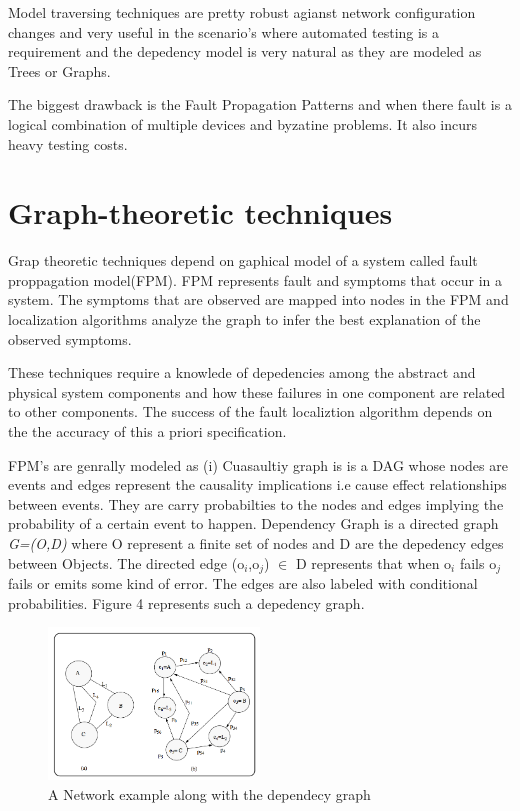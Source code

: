 \documentclass[10pt]{sigplan-proc-varsize}
\begin{document}
Model traversing techniques are pretty robust agianst network configuration changes and very useful in the scenario's where automated testing is a requirement and the depedency model is very natural as they are modeled as Trees or Graphs. 

The biggest drawback is the Fault Propagation Patterns and when there  fault is a logical combination of multiple devices and byzatine problems. It also incurs heavy testing costs. 

\section{Graph-theoretic techniques}
 
Grap theoretic techniques depend on gaphical model of a system called fault proppagation model(FPM). FPM represents fault and symptoms that occur in a system. 
The symptoms that are observed are mapped into nodes in the FPM and localization algorithms analyze the graph to infer the best explanation of the observed symptoms. 

These techniques require a knowlede of depedencies among the abstract and physical system components and how these failures in one component are related to 
other components. The success of the fault localiztion algorithm depends on the the accuracy of this a priori specification.

FPM's are genrally modeled as (i) Cuasaultiy graph is is a DAG whose nodes are events and edges represent the causality implications i.e cause effect relationships 
between events. They are carry probabilties to the nodes and edges implying the probability of a certain event to happen. 
Dependency Graph is a directed graph {\it{G=(O,D)}} where O represent a finite set of nodes and D are the depedency edges between Objects. 
The directed edge (o$_{i}$,o$_{j}$) $\in$ D represents that when o$_{i}$ fails o$_{j}$ fails or emits some kind of error. 
The edges are also labeled with conditional probabilities. Figure 4 represents such a depedency graph.

\begin{figure}[h!]
  \caption{A Network example along with the dependecy graph \cite{Katzela:95}}
  \centering
    \includegraphics[width=0.5\textwidth]{Fig4}
\end{figure}
\end{document}
